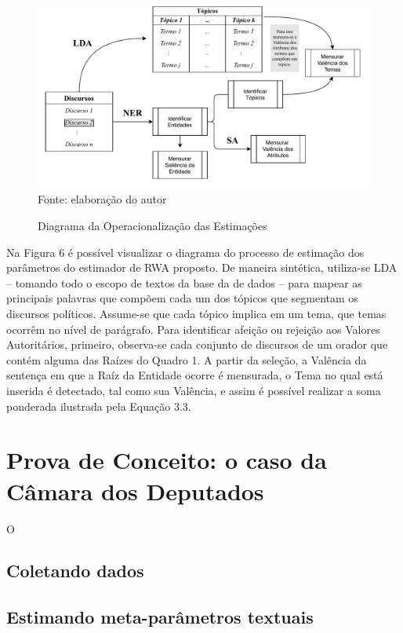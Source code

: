 \documentclass[
12pt,				%
openright,			%
twoside,			%
a4paper,			%
english,			%
french,				%
spanish,			%
brazil				%
]{abntex2}
\begin{document}
\begin{figure}[h]
	\caption{Diagrama da Operacionalização das Estimações}
	\label{fig:diagram_op}
	\centering
	\includegraphics[width=1\linewidth]{figures/diagrama_operacionalizacao}
	Fonte: elaboração do autor
\end{figure}
 
Na Figura 6 é possível visualizar o diagrama do processo de estimação dos parâmetros do estimador de RWA proposto. De maneira sintética, utiliza-se LDA  -- tomando todo o escopo de textos da base da de dados -- para mapear as principais palavras que compõem cada um dos tópicos que segmentam os discursos políticos. Assume-se que cada tópico implica em um tema, que temas ocorrêm no nível de parágrafo. Para identificar afeição ou rejeição aos Valores Autoritários, primeiro, observa-se cada conjunto de discursos de um orador que contém alguma das Raízes do Quadro 1. A partir da seleção, a Valência da sentença em que a Raíz da Entidade ocorre é mensurada, o Tema no qual está inserida é detectado, tal como sua Valência, e assim é possível realizar a soma ponderada ilustrada pela Equação 3.3.

\chapter{Prova de Conceito: o caso da Câmara dos Deputados}\label{resultados}

O 

\section{Coletando dados}

\section{Estimando meta-parâmetros textuais}
\end{document}
